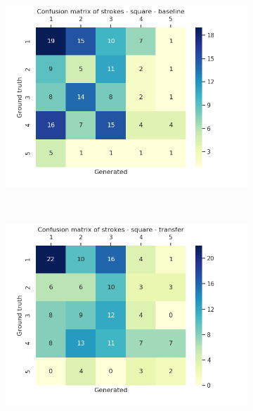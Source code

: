 \begin{figure}[!htbp]
      ~
      \begin{subfigure}[tb]{0.45\textwidth}
          \includegraphics[width=\textwidth]{images/sota/quickdraw_results/quickdraw_square_target_strokes_heatmap.png}
      \end{subfigure}
      ~
      \begin{subfigure}[tb]{0.45\textwidth}
          \includegraphics[width=\textwidth]{images/sota/quickdraw_results/quickdraw_square_transfer_strokes_heatmap.png}
      \end{subfigure}

    \end{figure}

